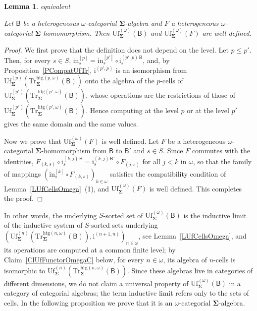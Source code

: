 \documentclass[a4paper, reqno]{amsbook}
\makeatletter
\newcommand{\sig}[1]{\mathbf{#1}}             %
\newcommand{\calg}[1]{\boldsymbol{\mathsf{#1}}} %
\newcommand{\htg}{\mathrm{htg}}                %
\newcommand{\Uf}{\mathrm{Uf}}
\newcommand{\Tr}{\mathrm{Tr}}
\theoremstyle{plain}
\newtheorem{lemma}[theorem]{Lemma}
\theoremstyle{definition}
\newcommand*{\CA@leanpending}{}
\newcommand*{\CA@leanrelation}{}
\newcommand*{\lean}[2]{%
  \ifcsname\string\color@lean@#1\endcsname\else
    \PackageError{main}{Unknown relation `#1' in \string\lean}{Use equivalent, weaker or stronger.}%
  \fi
  \gdef\CA@leanrelation{#1}%
  \gdef\CA@leanpending{#2}}
\makeatother
\begin{document}
\begin{lemma}\label{LUfWellDefOmega}\lean{equivalent}{Omega.unifiedHom}
Let $\calg{B}$ be a heterogeneous $\omega$-categorial $\sig{\Sigma}$-algebra and $F$ a heterogeneous $\omega$-categorial $\sig{\Sigma}$-homomorphism.
Then $\Uf^{(\omega)}_{\sig{\Sigma}}(\calg{B})$ and $\Uf^{(\omega)}_{\sig{\Sigma}}(F)$ are well defined.
\end{lemma}
\begin{proof}
We first prove that the definition does not depend on the level.
Let $p\leq p'$.
Then, for every $s\in S$, $\mathrm{in}^{[p]}_{s}=\mathrm{in}^{[p']}_{s}\circ\mathrm{i}^{(p',p)\,\calg{B}}_{s}$, and, by Proposition~\ref{PCompatUfTr}, $\mathrm{i}^{(p',p)}$ is an isomorphism from $\Uf^{(p)}_{\sig{\Sigma}}(\Tr^{\htg(p,\omega)}_{\sig{\Sigma}}(\calg{B}))$ onto the algebra of the $p$-cells of $\Uf^{(p')}_{\sig{\Sigma}}(\Tr^{\htg(p',\omega)}_{\sig{\Sigma}}(\calg{B}))$, whose operations are the restrictions of those of $\Uf^{(p')}_{\sig{\Sigma}}(\Tr^{\htg(p',\omega)}_{\sig{\Sigma}}(\calg{B}))$.
Hence computing at the level $p$ or at the level $p'$ gives the same domain and the same values.

Now we prove that $\Uf^{(\omega)}_{\sig{\Sigma}}(F)$ is well defined.
Let $F$ be a heterogeneous $\omega$-categorial $\sig{\Sigma}$-homomorphism from $\calg{B}$ to $\calg{B}'$ and $s\in S$.
Since $F$ commutes with the identities, $F_{(k,s)}\circ\mathrm{i}^{(k,j)\,\calg{B}}_{s}=\mathrm{i}^{(k,j)\,\calg{B}'}_{s}\circ F_{(j,s)}$ for all $j<k$ in $\omega$, so that the family of mappings $(\mathrm{in}^{[k]}_{s}\circ F_{(k,s)})_{k\in\omega}$ satisfies the compatibility condition of Lemma~\ref{LUfCellsOmega}~(1), and $\Uf^{(\omega)}_{\sig{\Sigma}}(F)$ is well defined. This completes the proof.
\end{proof}

In other words, the underlying $S$-sorted set of $\Uf^{(\omega)}_{\sig{\Sigma}}(\calg{B})$ is the inductive limit of the inductive system of $S$-sorted sets underlying $(\Uf^{(n)}_{\sig{\Sigma}}(\Tr^{\htg(n,\omega)}_{\sig{\Sigma}}(\calg{B})),\mathrm{i}^{(n+1,n)})_{n\in\omega}$, see Lemma~\ref{LUfCellsOmega}, and its operations are computed at a common finite level; by Claim~\ref{ClUfFunctorOmegaC} below, for every $n\in\omega$, its algebra of $n$-cells is isomorphic to $\Uf^{(n)}_{\sig{\Sigma}}(\Tr^{\htg(n,\omega)}_{\sig{\Sigma}}(\calg{B}))$.
Since these algebras live in categories of different dimensions, we do not claim a universal property of $\Uf^{(\omega)}_{\sig{\Sigma}}(\calg{B})$ in a category of categorial algebras; the term inductive limit refers only to the sets of cells.
In the following proposition we prove that it is an $\omega$-categorial $\sig{\Sigma}$-algebra.
\end{document}

